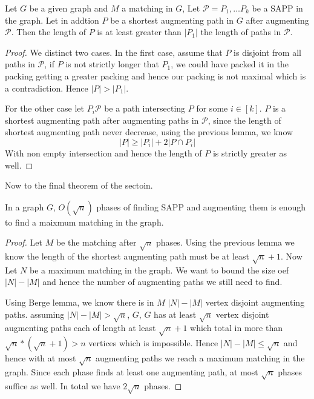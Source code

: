 \begin{lemma}
	Let $G$ be a given graph and $M$ a matching in $G$, Let $\mathcal{P} =  P_1, \dots P_k$ be a SAPP in the graph. Let in addtion $P$ be a shortest augmenting path in $G$ after augmenting $\mathcal{P}$. Then the length of $P$ is at least greater than $|P_1|$ the length of paths in $\mathcal{P}$.
\end{lemma}
\begin{proof}
	We distinct two cases. In the first case, assume that $P$ is disjoint from all paths in $\mathcal{P}$, if $P$ is not strictly longer that $P_1$, we could have packed it in the packing getting a greater packing and hence our packing is not maximal which is a contradiction. Hence $|P| > |P_1|$.

	For the other case let $P_i \mathcal{P}$ be a path intersecting $P$ for some $i \in [k]$. $P$ is a shortest augmenting path after augmenting paths in $\mathcal{P}$, since the length of shortest augmenting path never decrease, using the previous lemma, we know
	$$|P| \geq |P_i| + 2 |P \cap P_i|$$  
	With non empty intersection and hence the length of $P$ is strictly greater as well.
\end{proof}

Now to the final theorem of the sectoin.
\begin{theorem}
	In a graph $G$, $O(\sqrt n)$ phases of finding SAPP and augmenting them is enough to find a maixmum matching in the graph.
\end{theorem}
\begin{proof}
	Let $M$ be the matching after $\sqrt n$ phases. Using the previous lemma we know the length of the shortest augmenting path must be at least $\sqrt n + 1$. Now Let $N$ be a maximum matching in the graph. We want to bound the size oef $|N| - |M|$ and hence the number of augmenting paths we still need to find.

	Using Berge lemma, we know there is in $M$ $|N| - |M|$ vertex disjoint augmenting paths. assuming $|N| - |M| > \sqrt n$, $G$, $G$ has at least $\sqrt n$ vertex disjoint augmenting paths each of length at least $\sqrt n + 1$ which total in more than $\sqrt n * (\sqrt n + 1) > n$ vertices which is impossible. Hence $|N| - |M| \leq \sqrt n$ and hence with at most $\sqrt n$ augmenting paths we reach a maximum matching in the graph. Since each phase finds at least one augmenting path, at most $\sqrt n$ phases suffice as well. In total we have $2 \sqrt n$ phases.
\end{proof}
